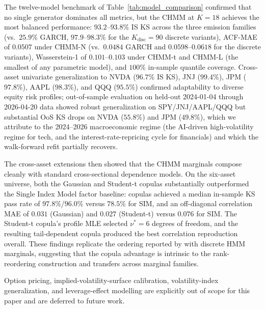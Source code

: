 The twelve-model benchmark of Table~\ref{tab:model_comparison} confirmed that no single generator dominates all metrics, but the CHMM at $K = 18$ achieves the most balanced performance: $93.2$--$93.8\%$ IS KS across the three emission families (vs.\ $25.9\%$ GARCH, $97.9$--$98.3\%$ for the $K_{\text{disc}} = 90$ discrete variants), ACF-MAE of $0.0507$ under CHMM-N (vs.\ $0.0484$ GARCH and $0.0598$--$0.0618$ for the discrete variants), Wasserstein-1 of $0.101$--$0.103$ under CHMM-t and CHMM-L (the smallest of any parametric model), and $100\%$ in-sample quantile coverage.
Cross-asset univariate generalization to NVDA ($96.7\%$ IS KS), JNJ ($99.4\%$), JPM ($97.8\%$), AAPL ($98.3\%$), and QQQ ($95.5\%$) confirmed adaptability to diverse equity risk profiles; out-of-sample evaluation on held-out 2024-01-04 through 2026-04-20 data showed robust generalization on SPY/JNJ/AAPL/QQQ but substantial OoS KS drops on NVDA ($55.8\%$) and JPM ($49.8\%$), which we attribute to the 2024--2026 macroeconomic regime (the AI-driven high-volatility regime for tech, and the interest-rate-repricing cycle for financials) and which the walk-forward refit partially recovers.

The cross-asset extensions then showed that the CHMM marginals compose cleanly with standard cross-sectional dependence models.
On the six-asset universe, both the Gaussian and Student-t copulas substantially outperformed the Single Index Model factor baseline: copulas achieved a median in-sample KS pass rate of $97.8\%$/$96.0\%$ versus $78.5\%$ for SIM, and an off-diagonal correlation MAE of $0.031$ (Gaussian) and $0.027$ (Student-t) versus $0.076$ for SIM.
The Student-t copula's profile MLE selected $\nu^* = 6$ degrees of freedom, and the resulting tail-dependent copula produced the best correlation reproduction overall.
These findings replicate the ordering reported by \citet{alswaidan2026hybrid} with discrete HMM marginals, suggesting that the copula advantage is intrinsic to the rank-reordering construction and transfers across marginal families.

Option pricing, implied-volatility-surface calibration, volatility-index generalization, and leverage-effect modelling are explicitly out of scope for this paper and are deferred to future work.

